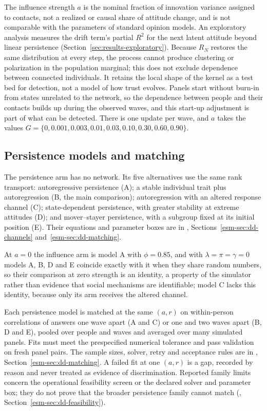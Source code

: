 The influence strength $a$ is the nominal fraction of innovation variance assigned to contacts, not a realized or causal share of attitude change, and is not comparable with the parameters of standard opinion models. An exploratory analysis measures the drift term's partial $R^2$ for the next latent attitude beyond linear persistence (Section~\ref{sec:results-exploratory}). Because $R_N$ restores the same distribution at every step, the process cannot produce clustering or polarization in the population marginal; this does not exclude dependence between connected individuals. It retains the local shape of the kernel as a test bed for detection, not a model of how trust evolves. Panels start without burn-in from states unrelated to the network, so the dependence between people and their contacts builds up during the observed waves, and this start-up adjustment is part of what can be detected. There is one update per wave, and $a$ takes the values $G=\{0,0.001,0.003,0.01,0.03,0.10,0.30,0.60,0.90\}$.

\subsection{Persistence models and matching}\label{sec:methods-persistence}

The persistence arm has no network. Its five alternatives use the same rank transport: autoregressive persistence (A); a stable individual trait plus autoregression (B, the main comparison); autoregression with an altered response channel (C); state-dependent persistence, with greater stability at extreme attitudes (D); and mover--stayer persistence, with a subgroup fixed at its initial position (E). Their equations and parameter boxes are in \esmresource, Sections~\ref{esm-sec:dd-channels} and~\ref{esm-sec:dd-matching}.

At $a=0$ the influence arm is model A with $\phi=0.85$, and with $\lambda=\pi=\gamma=0$ models A, B, D and E coincide exactly with it when they share random numbers, so their comparison at zero strength is an identity, a property of the simulator rather than evidence that social mechanisms are identifiable; model C lacks this identity, because only its arm receives the altered channel.

Each persistence model is matched at the same $(a,r)$ on within-person correlations of answers one wave apart (A and C) or one and two waves apart (B, D and E), pooled over people and waves and averaged over many simulated panels. Fits must meet the prespecified numerical tolerance and pass validation on fresh panel pairs. The sample sizes, solver, retry and acceptance rules are in \esmresource, Section~\ref{esm-sec:dd-matching}. A failed fit at one $(a,r)$ is a gap, recorded by reason and never treated as evidence of discrimination. Reported family limits concern the operational feasibility screen or the declared solver and parameter box; they do not prove that the broader persistence family cannot match (\esmresource, Section~\ref{esm-sec:dd-feasibility}).

